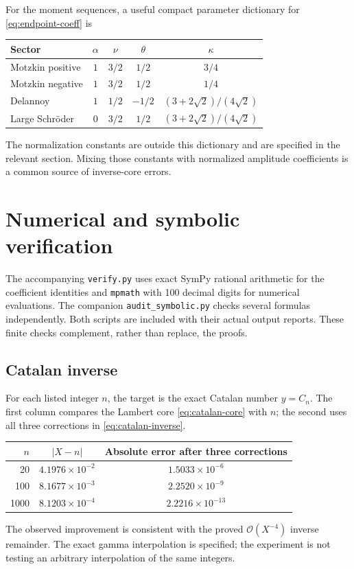 \documentclass[11pt,a4paper]{article}
\numberwithin{equation}{section}
\theoremstyle{definition}
\theoremstyle{remark}
\newcommand{\bigO}{\mathcal O}
\begin{document}
For the moment sequences, a useful compact parameter dictionary for \eqref{eq:endpoint-coeff} is
\begin{center}
\begin{tabular}{lcccc}
\toprule
Sector & $\alpha$ & $\nu$ & $\theta$ & $\kappa$\\\midrule
Motzkin positive & $1$ & $3/2$ & $1/2$ & $3/4$\\
Motzkin negative & $1$ & $3/2$ & $1/2$ & $1/4$\\
Delannoy & $1$ & $1/2$ & $-1/2$ & $(3+2\sqrt2)/(4\sqrt2)$\\
Large Schr\"oder & $0$ & $3/2$ & $1/2$ & $(3+2\sqrt2)/(4\sqrt2)$\\\bottomrule
\end{tabular}
\end{center}
The normalization constants are outside this dictionary and are specified in the relevant section. Mixing those constants with normalized amplitude coefficients is a common source of inverse-core errors.

\section{Numerical and symbolic verification}
\label{app:verification}

The accompanying \texttt{verify.py} uses exact SymPy rational arithmetic for the coefficient identities and \texttt{mpmath} with 100 decimal digits for numerical evaluations. The companion \texttt{audit\_symbolic.py} checks several formulas independently. Both scripts are included with their actual output reports. These finite checks complement, rather than replace, the proofs.

\subsection{Catalan inverse}

For each listed integer $n$, the target is the exact Catalan number $y=C_n$. The first column compares the Lambert core \eqref{eq:catalan-core} with $n$; the second uses all three corrections in \eqref{eq:catalan-inverse}.
\begin{center}
\begin{tabular}{rcc}
\toprule
$n$ & $|X-n|$ & Absolute error after three corrections\\\midrule
20 & $4.1976\times10^{-2}$ & $1.5033\times10^{-6}$\\
100 & $8.1677\times10^{-3}$ & $2.2520\times10^{-9}$\\
1000 & $8.1203\times10^{-4}$ & $2.2216\times10^{-13}$\\\bottomrule
\end{tabular}
\end{center}
The observed improvement is consistent with the proved $\bigO(X^{-4})$ inverse remainder. The exact gamma interpolation is specified; the experiment is not testing an arbitrary interpolation of the same integers.
\end{document}

